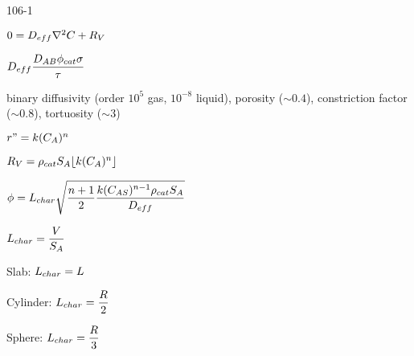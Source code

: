 \begin{mitframe}{106-1}
\begin{listone}
	\item $0=\elecdisplace_{eff}\nabla^2\conc+\specsource$
    	\begin{listtwo}
        	\item $\elecdisplace_{eff}\dfrac{\elecdisplace_{\helmholtz\exergy}\eleccoeff_{cat}\molecrad}{\torque}$
            	\begin{listthree}
                	\item binary diffusivity (order $10^5$ gas, $10^{-8}$ liquid), porosity ($\sim0.4$), constriction factor ($\sim0.8$), tortuosity ($\sim3$)
                \end{listthree}
        \item $\pos"=\thermcond(\conc_{\helmholtz})^n$
        	\begin{listthree}
            	\item $\specsource=\dens_{cat}\entropy_{\helmholtz}\lfloor\thermcond(\conc_{\helmholtz})^n\rfloor$
               \end{listthree}
        \end{listtwo}
\item $\eleccoeff=\length_{char}\sqrt{\dfrac{n+1}{2}\dfrac{\thermcond(\conc_{\helmholtz\entropy})^{n-1}\dens_{cat}\entropy_{\helmholtz}}{\elecdisplace_{eff}}}$
		\begin{listtwo}
        	\item $\length_{char}=\dfrac{\vol}{\entropy_{\helmholtz}}$
            \begin{listthree}
            	\item Slab: $\length_{char}=\length$
                \item Cylinder: $\length_{char}=\dfrac{\gasconst}{2}$
                \item Sphere: $\length_{char}=\dfrac{\gasconst}{3}$
            \end{listthree}
        \end{listtwo}
\end{listone}    
\end{mitframe}